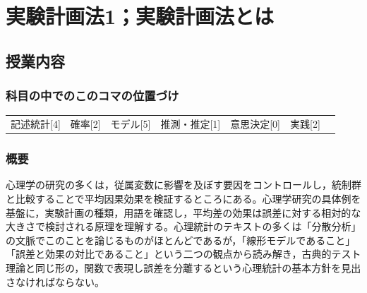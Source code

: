 \section{実験計画法1；実験計画法とは}
\label{lesson12}

\subsection{授業内容}
\subsubsection{科目の中でのこのコマの位置づけ}
\begin{tabular}[t]{ccccccc}
    記述統計[4] & 確率[2] & モデル[5] & 推測・推定[1] & 意思決定[0] & 実践[2]
\end{tabular}
\subsubsection{概要}
心理学の研究の多くは，従属変数に影響を及ぼす要因をコントロールし，統制群と比較することで平均因果効果を検証するところにある。心理学研究の具体例を基盤に，実験計画の種類，用語を確認し，平均差の効果は誤差に対する相対的な大きさで検討される原理を理解する。心理統計のテキストの多くは「分散分析」の文脈でこのことを論じるものがほとんどであるが，「線形モデルであること」「誤差と効果の対比であること」という二つの観点から読み解き，古典的テスト理論と同じ形の，関数で表現し誤差を分離するという心理統計の基本方針を見出さなければならない。
